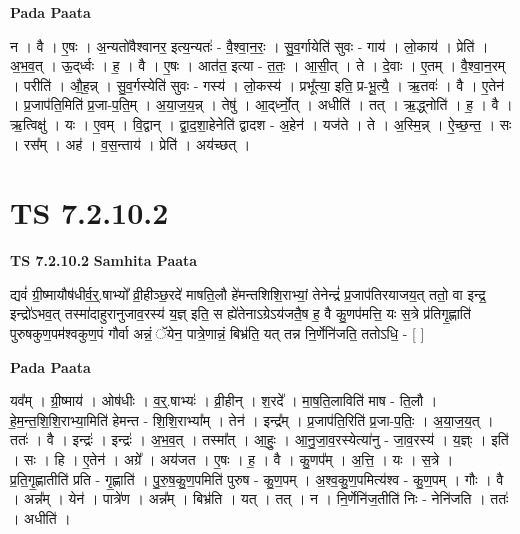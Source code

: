 \documentclass[17pt]{extarticle}
\begin{document}
\textbf{Pada Paata} \newline

न । वै । ए॒षः । अ॒न्यतो॑वैश्वानर॒ इत्य॒न्यतः॑ - वै॒श्वा॒न॒रः॒ । सु॒व॒र्गायेति॑ सुवः - गाय॑ । लो॒काय॑ । प्रेति॑ । अ॒भ॒व॒त् । ऊ॒द्‌र्ध्वः । ह॒ । वै । ए॒षः । आत॑त॒ इत्या - त॒तः॒ । आ॒सी॒त् । ते । दे॒वाः । ए॒तम् । वै॒श्वा॒न॒रम् । परीति॑ । औ॒ह॒न्न् । सु॒व॒र्गस्येति॑ सुवः - गस्य॑ । लो॒कस्य॑ । प्रभू᳚त्या॒ इति॒ प्र-भू॒त्यै॒ । ऋ॒तवः॑ । वै । ए॒तेन॑ । प्र॒जाप॑ति॒मिति॑ प्र॒जा-प॒ति॒म् । अ॒या॒ज॒य॒न्न् । तेषु॑ । आ॒द्‌र्ध्नो॒त् । अधीति॑ । तत् । ऋ॒द्ध्नोति॑ । ह॒ । वै । ऋ॒त्विक्षु॑ । यः । ए॒वम् । वि॒द्वान् । द्वा॒द॒शा॒हेनेति॑ द्वादश - अ॒हेन॑ । यज॑ते । ते । अ॒स्मि॒न्न् । ऐ॒च्छ॒न्त॒ । सः । रस᳚म् । अह॑ । व॒स॒न्ताय॑ । प्रेति॑ । अय॑च्छत् ।  \newline




\section*{ TS 7.2.10.2 }

\textbf{TS 7.2.10.2 } \newline
\textbf{Samhita Paata} \newline

द्यवं॑ ग्री॒ष्मायौष॑धीर्व॒र्॒.षाभ्यो᳚ व्री॒हीञ्छ॒रदे॑ माषति॒लौ हे॑मन्तशिशि॒राभ्यां॒ तेनेन्द्रं॑ प्र॒जाप॑तिरयाजय॒त् ततो॒ वा इन्द्र॒ इन्द्रो॑ऽभव॒त् तस्मा॑दाहुरानुजाव॒रस्य॑ य॒ज्ञ् इति॒ स ह्ये॑तेनाऽग्रेऽय॑जतै॒ष ह॒ वै कु॒णप॑मत्ति॒ यः स॒त्रे प्र॑तिगृ॒ह्णाति॑ पुरुषकुण॒पम॑श्वकुण॒पं गौर्वा अन्नं॒ ॅयेन॒ पात्रे॒णान्नं॒ बिभ्र॑ति॒ यत् तन्न नि॒र्णेनि॑जति॒ ततोऽधि॒ - [  ] \newline

\textbf{Pada Paata} \newline

यव᳚म् । ग्री॒ष्माय॑ । ओष॑धीः । व॒र्॒.षाभ्यः॑ । व्री॒हीन् । श॒रदे᳚ । मा॒ष॒ति॒लाविति॑ माष - ति॒लौ । हे॒म॒न्त॒शि॒शि॒राभ्या॒मिति॑ हेमन्त - शि॒शि॒राभ्या᳚म् । तेन॑ । इन्द्र᳚म् । प्र॒जाप॑ति॒रिति॑ प्र॒जा-प॒तिः॒ । अ॒या॒ज॒य॒त् । ततः॑ । वै । इन्द्रः॑ । इन्द्रः॑ । अ॒भ॒व॒त् । तस्मा᳚त् । आ॒हुः॒ । आ॒नु॒जा॒व॒रस्येत्या॑नु - जा॒व॒रस्य॑ । य॒ज्ञ्ः । इति॑ । सः । हि । ए॒तेन॑ । अग्रे᳚ । अय॑जत । ए॒षः । ह॒ । वै । कु॒णप᳚म् । अ॒त्ति॒ । यः । स॒त्रे । प्र॒ति॒गृ॒ह्णातीति॑ प्रति - गृ॒ह्णाति॑ । पु॒रु॒ष॒कु॒ण॒पमिति॑ पुरुष - कु॒ण॒पम् । अ॒श्व॒कु॒ण॒पमित्य॑श्व - कु॒ण॒पम् । गौः । वै । अन्न᳚म् । येन॑ । पात्रे॑ण । अन्न᳚म् । बिभ्र॑ति । यत् । तत् । न । नि॒र्णेनि॑ज॒तीति॑ निः - नेनि॑जति । ततः॑ । अधीति॑ ।  \newline
\end{document}
